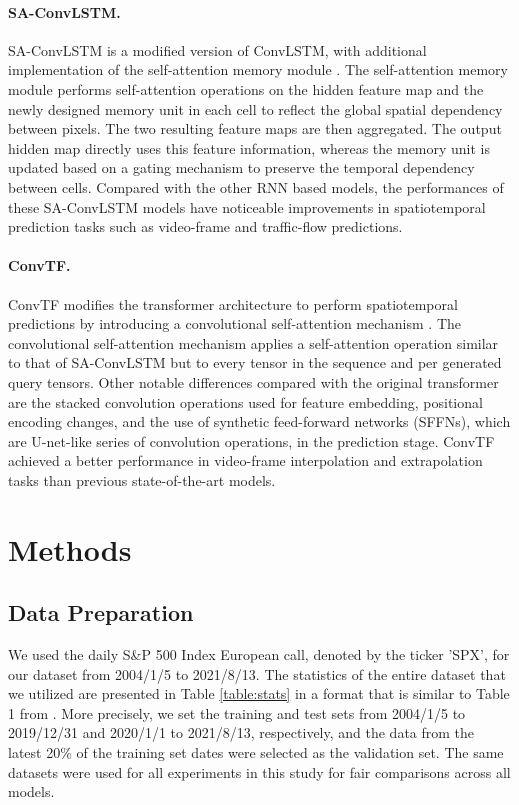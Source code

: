 \documentclass{article}
\begin{document}
\paragraph{SA-ConvLSTM.}
SA-ConvLSTM is a modified version of ConvLSTM, with additional implementation of the self-attention memory module \citep{lin2020selfattention}. 
The self-attention memory module performs self-attention operations on the hidden feature map and the newly designed memory unit in each cell to reflect the global spatial dependency between pixels. The two resulting feature maps are then aggregated. 
The output hidden map directly uses this feature information, whereas the memory unit is updated based on a gating mechanism to preserve the temporal dependency between cells. 
Compared with the other RNN based models, the performances of these SA-ConvLSTM models have noticeable improvements in spatiotemporal prediction tasks such as video-frame and traffic-flow predictions.
\paragraph{ConvTF.}
ConvTF modifies the transformer architecture to perform spatiotemporal predictions by introducing a convolutional self-attention mechanism \citep{liu2021convtransformer}. 
The convolutional self-attention mechanism applies a self-attention operation similar to that of SA-ConvLSTM but to every tensor in the sequence and per generated query tensors. 
Other notable differences compared with the original transformer are the stacked convolution operations used for feature embedding, positional encoding changes, and the use of synthetic feed-forward networks (SFFNs), which are U-net-like series of convolution operations, in the prediction stage. ConvTF achieved a better performance in video-frame interpolation and extrapolation tasks than previous state-of-the-art models.


\section{Methods}
\subsection{Data Preparation} \label{data prep}
We used the daily S\&P 500 Index European call, denoted by the ticker 'SPX', for our dataset from 2004/1/5 to 2021/8/13. The statistics of the entire dataset that we utilized are presented in Table \ref{table:stats} in a format that is similar to Table 1 from \cite{tablestats}. 
More precisely, we set the training and test sets from 2004/1/5 to 2019/12/31 and 2020/1/1 to 2021/8/13, respectively, and the data from the latest 20\% of the training set dates were selected as the validation set.
The same datasets were used for all experiments in this study for fair comparisons across all models.
\end{document}
